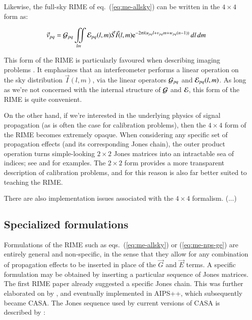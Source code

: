 \documentclass[]{aa}
\begin{document}
Likewise, the full-sky RIME of eq.~(\ref{eq:me-allsky}) can be written in the $4\times4$ form as:

    \begin{equation}\label{eq:allsky:mueller}
\vec v_{pq} = {\cal G}_{pq} \iint\limits_{lm} {\cal E}_{pq}(l,m) \vec S \vec I(l,m) {\rm e}^{-2\pi i(u_{pq} l+v_{pq} m+w_{pq} (n-1))} \,dl\,dm 
    \end{equation}

This form of the RIME is particularly favoured when describing imaging problems \citep{SB:imageplane,Rau:DDEs}. It emphasizes that an interferometer performs a linear operation on the sky distribution $\vec I(l,m)$, via the linear operators ${\cal G}_{pq}$ and ${\cal E}_{pq}(l,m)$. As long as we're not concerned with the internal structure of
${\cal G}$ and ${\cal E}$, this form of the RIME is quite convenient. 

On the other hand, if we're interested in the underlying physics of signal propagation (as is often the case for calibration problems), then the $4\times4$ form of the RIME becomes extremely opaque. When considering any specific set of propagation effects (and its corresponding Jones chain), the outer product operation turns simple-looking $2\times2$ Jones matrices into an intractable sea of indices; see \citet[eq. 4]{SB:imageplane} and \citet[Appendix A]{ME1} for examples. The $2\times2$ form provides a more transparent description of calibration problems, and for this reason is also far better suited to teaching the RIME.

There are also implementation issues associated with the $4\times4$ formalism. (...) 

\subsection{Specialized formulations} 

Formulations of the RIME such as eqs.~(\ref{eq:me-allsky}) or (\ref{eq:me-nps-ge}) are entirely general and non-specific, in the sense that they allow for any combination of propagation effects to be inserted in place of the $\vec G$ and $\vec E$ terms. A specific formulation may be obtained by inserting a particular sequence of Jones matrices. The first RIME paper \citep{ME1} already suggested a specific Jones chain. This was further elaborated on by \citet{JEN:note185}, and eventually implemented in AIPS++, which subsequently became CASA. The Jones sequence used by current versions of CASA is described by \citet[Appendix E.1]{CASA:UserRef}:
\end{document}
